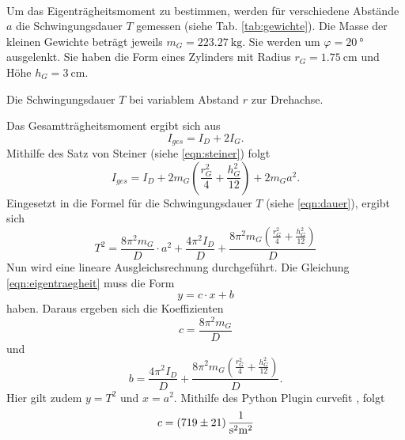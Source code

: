 \\
Um das Eigenträgheitsmoment zu bestimmen, werden für verschiedene Abstände $a$ die Schwingungsdauer $T$ gemessen (siehe Tab. \ref{tab:gewichte}).
Die Masse der kleinen Gewichte beträgt jeweils $m_G = \SI{223,27}{\kg}$.
Sie werden um $\varphi = \SI{20}{\degree}$ ausgelenkt.
Sie haben die Form eines Zylinders mit Radius $r_G=\SI{1,75}{\centi\metre}$ und Höhe $h_G=\SI{3}{\centi\metre}$.
\begin{table}
    \centering
    \caption{Die Schwingungsdauer $T$ bei variablem Abstand $r$ zur Drehachse.}
    \label{tab:gewichte}  
\end{table}
\FloatBarrier
Das Gesamtträgheitsmoment ergibt sich aus
\begin{equation*}
    I_{ges} = I_D + 2 I_G .
\end{equation*}
Mithilfe des Satz von Steiner (siehe \autoref{eqn:steiner}) folgt
\begin{equation*}
    I_{ges} = I_D + 2 m_G \left ( \frac{r^2_G}{4} + \frac{h^2_G}{12} \right) + 2 m_G a^2 .
\end{equation*}
Eingesetzt in die Formel für die Schwingungsdauer $T$ (siehe \autoref{eqn:dauer}), ergibt sich
\begin{equation}
    T^2 = \frac{8 \pi^2 m_G}{D} \cdot a^2 + \frac{4 \pi^2 I_D}{D} + \frac{8 \pi^2 m_G \left (\frac{r^2_G}{4} + \frac{h^2_G}{12} \right )}{D}
    \label{eqn:eigentraegheit}
\end{equation}
Nun wird eine lineare Ausgleichsrechnung durchgeführt.
Die Gleichung \ref{eqn:eigentraegheit} muss die Form
\begin{equation*}
    y = c \cdot x + b 
\end{equation*}
haben.
Daraus ergeben sich die Koeffizienten
\begin{equation*}
    c = \frac{8\pi^2m_G}{D}
\end{equation*}
und
\begin{equation}
    b = \frac{4 \pi^2 I_D}{D} + \frac{8 \pi^2 m_G \left (\frac{r^2_G}{4} + \frac{h^2_G}{12} \right )}{D}.
    \label{eqn:b}
\end{equation}
Hier gilt zudem $y = T^2$ und $x = a^2$.
Mithilfe des Python Plugin curvefit \cite{scipy}, folgt
\begin{equation*}
    c = \SI{719(21)}{\frac{1}{\second^2 \metre^2}}
\end{equation*}
